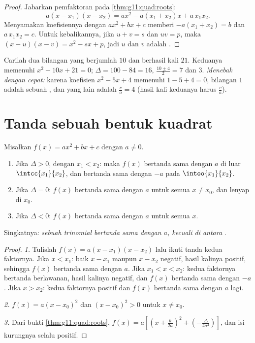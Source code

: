 \begin{proof}
Jabarkan pemfaktoran pada \cref{thm:g11:quad:roots}:
\[
a(x - x_1)(x - x_2) = a x^2 - a(x_1 + x_2)x + a\,x_1 x_2 .
\]
Menyamakan koefisiennya dengan $ax^2 + bx + c$ memberi
$-a(x_1+x_2) = b$ dan $a\,x_1x_2 = c$. Untuk kebalikannya, jika $u + v = s$ dan
$uv = p$, maka $(x-u)(x-v) = x^2 - sx + p$, jadi $u$ dan $v$ adalah .
\end{proof}

\begin{example}
Carilah dua bilangan yang berjumlah $10$ dan berhasil kali $21$. Keduanya
memenuhi $x^2 - 10x + 21 = 0$; $\Delta = 100 - 84 = 16$, 
$\frac{10 \pm 4}{2} = 7$ dan $3$. \emph{Menebak  dengan cepat:} karena
koefisien $x^2 - 5x + 4$ memenuhi $1 - 5 + 4 = 0$, bilangan $1$ adalah
sebuah , dan  yang lain adalah $\frac{c}{a} = 4$ (hasil kali keduanya
harus $\frac ca$).
\end{example}

\section{Tanda sebuah bentuk kuadrat}

\begin{theorem}\label{thm:g11:quad:sign}
Misalkan $f(x) = ax^2+bx+c$ dengan $a \neq 0$.
\begin{enumerate}
  \item Jika $\Delta > 0$, dengan  $x_1 < x_2$: maka $f(x)$ bertanda sama
        dengan $a$ di luar $\intcc{x_1}{x_2}$, dan bertanda sama dengan $-a$
        pada $\intoo{x_1}{x_2}$.
  \item Jika $\Delta = 0$: $f(x)$ bertanda sama dengan $a$ untuk semua
        $x \neq x_0$, dan lenyap di $x_0$.
  \item Jika $\Delta < 0$: $f(x)$ bertanda sama dengan $a$ untuk semua $x$.
\end{enumerate}
Singkatnya: \emph{sebuah trinomial bertanda sama dengan $a$, kecuali di antara }.
\end{theorem}

\begin{proof}
\emph{1.} Tulislah $f(x) = a(x-x_1)(x-x_2)$ lalu ikuti tanda kedua
faktornya. Jika $x < x_1$: baik $x - x_1$ maupun $x - x_2$ negatif, hasil
kalinya positif, sehingga $f(x)$ bertanda sama dengan $a$. Jika $x_1 < x < x_2$:
kedua faktornya bertanda berlawanan, hasil kalinya negatif, dan $f(x)$ bertanda
sama dengan $-a$. Jika $x > x_2$: kedua faktornya positif dan $f(x)$ bertanda
sama dengan $a$ lagi.

\emph{2.} $f(x) = a(x - x_0)^2$ dan $(x-x_0)^2 > 0$ untuk $x \neq x_0$.

\emph{3.} Dari bukti \cref{thm:g11:quad:roots},
$f(x) = a\left[\left(x + \frac{b}{2a}\right)^2 +
\left(-\frac{\Delta}{4a^2}\right)\right]$, dan isi kurungnya selalu
positif.
\end{proof}

